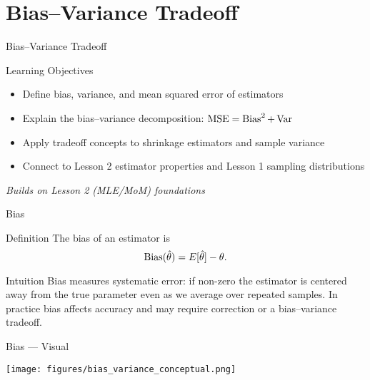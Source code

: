 
\section{Bias--Variance Tradeoff}

\begin{frame}{Bias--Variance Tradeoff}
  \begin{block}{Learning Objectives}
    \begin{itemize}
      \item Define bias, variance, and mean squared error of estimators
      \item Explain the bias--variance decomposition: $\operatorname{MSE} = \operatorname{Bias}^2 + \operatorname{Var}$
      \item Apply tradeoff concepts to shrinkage estimators and sample variance
      \item Connect to Lesson 2 estimator properties and Lesson 1 sampling distributions
    \end{itemize}
  \end{block}

  \vspace{1em}
  \begin{center}
    \textit{Builds on Lesson 2 (MLE/MoM) foundations}
  \end{center}
\end{frame}

\begin{frame}{Bias}
  \begin{block}{Definition}
    The bias of an estimator is
    \[\operatorname{Bias}(\hat{\theta}) = E[\hat{\theta}] - \theta.\]
  \end{block}

  \begin{block}{Intuition}
    Bias measures systematic error: if non-zero the estimator is centered away
    from the true parameter even as we average over repeated samples. In practice
    bias affects accuracy and may require correction or a bias--variance tradeoff.
  \end{block}
\end{frame}

\begin{frame}{Bias --- Visual}
  \begin{center}
    \texttt{[image: figures/bias\_variance\_conceptual.png]}
  \end{center}
\end{frame}

